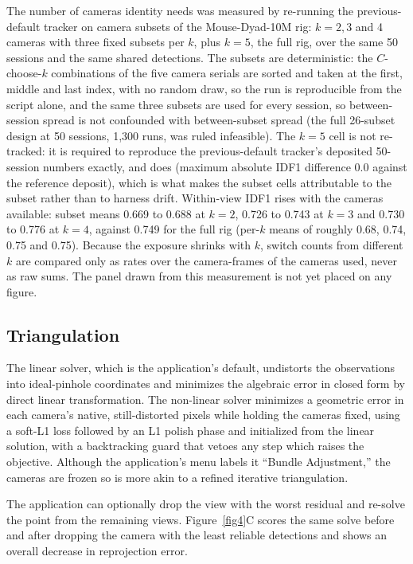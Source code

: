 \documentclass[pdflatex, sn-nature]{sn-jnl}
\theoremstyle{thmstyleone}%
\theoremstyle{thmstyletwo}%
\theoremstyle{thmstylethree}%
\begin{document}
The number of cameras identity needs was measured by re-running the previous-default tracker on camera subsets of the Mouse-Dyad-10M rig: $k = 2, 3$ and 4 cameras with three fixed subsets per $k$, plus $k = 5$, the full rig, over the same 50 sessions and the same shared detections. The subsets are deterministic: the $C$-choose-$k$ combinations of the five camera serials are sorted and taken at the first, middle and last index, with no random draw, so the run is reproducible from the script alone, and the same three subsets are used for every session, so between-session spread is not confounded with between-subset spread (the full 26-subset design at 50 sessions, 1,300 runs, was ruled infeasible). The $k = 5$ cell is not re-tracked: it is required to reproduce the previous-default tracker's deposited 50-session numbers exactly, and does (maximum absolute IDF1 difference 0.0 against the reference deposit), which is what makes the subset cells attributable to the subset rather than to harness drift. Within-view IDF1 rises with the cameras available: subset means 0.669 to 0.688 at $k = 2$, 0.726 to 0.743 at $k = 3$ and 0.730 to 0.776 at $k = 4$, against 0.749 for the full rig (per-$k$ means of roughly 0.68, 0.74, 0.75 and 0.75). Because the exposure shrinks with $k$, switch counts from different $k$ are compared only as rates over the camera-frames of the cameras used, never as raw sums. The panel drawn from this measurement is not yet placed on any figure.

\subsection{Triangulation}\label{methods-triangulation}

The linear solver, which is the application's default, undistorts the observations into ideal-pinhole coordinates and minimizes the algebraic error in closed form by direct linear transformation. The non-linear solver minimizes a geometric error in each camera's native, still-distorted pixels while holding the cameras fixed, using a soft-L1 loss followed by an L1 polish phase and initialized from the linear solution, with a backtracking guard that vetoes any step which raises the objective. Although the application's menu labels it ``Bundle Adjustment,'' the cameras are frozen so is more akin to a refined iterative triangulation. 

The application can optionally drop the view with the worst residual and re-solve the point from the remaining views. Figure~\ref{fig4}C scores the same solve before and after dropping the camera with the least reliable detections and shows an overall decrease in reprojection error. 
\end{document}
